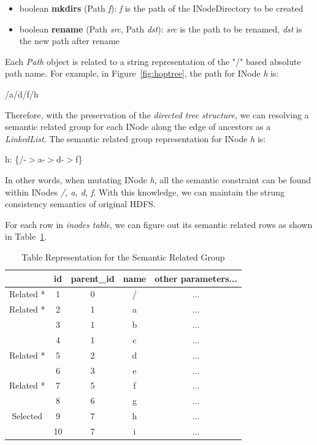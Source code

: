 \begin{itemize}[noitemsep]
	\item boolean \textbf{mkdirs} (Path \textit{f}): \textit{f} is the path of the INodeDirectory to be created
	\item boolean \textbf{rename} (Path \textit{src}, Path \textit{dst}): \textit{src} is the path to be renamed, \textit{dst} is the new path after rename
\end{itemize} 

\noindent Each \textit{Path} object is related to a string representation of the "/" based absolute path name. For example, in Figure~\ref{fig:hoptree}, the path for INode \textit{h} is: 
\begin{center}
	/a/d/f/h
\end{center}

\noindent Therefore, with the preservation of the \textit{directed tree structure}, we can resolving a semantic related group for each INode along the edge of ancestors as a \textit{LinkedList}. The semantic related group representation for INode \textit{h} is:
\begin{center}
	h: \{/-$>$a-$>$d-$>$f\}
\end{center}

\noindent In other words, when mutating INode \textit{h}, all the semantic constraint can be found within INodes \textit{/, a, d, f}. With this knowledge, we can maintain the strung consistency semantics of original HDFS.

\noindent For each row in \textit{inodes table}, we can figure out its semantic related rows as shown in Table~\ref{table:semanticrelatedTable}.

\begin{table}[h]
	\centering
	\begin{tabular}{|c|c|c|c|c|}
		\hline
		~ & \textbf{id} & \textbf{parent\_id} & \textbf{name} & \textbf{other parameters...} \\ \hline
		Related * & 1 & 0 & / & ... \\ \hline
		Related * & 2 & 1 & a & ... \\ \hline
		~ & 3 & 1 & b & ... \\ \hline
		~ & 4 & 1 & c & ... \\ \hline
		Related * & 5 & 2 & d & ... \\ \hline
		~ & 6 & 3 & e & ... \\ \hline
		Related * & 7 & 5 & f & ... \\ \hline
		~ & 8 & 6 & g & ... \\ \hline
		Selected \checkmark & 9 & 7 & h & ... \\ \hline
		~ & 10 & 7 & i & ... \\ \hline
	\end{tabular}
	\caption{Table Representation for the Semantic Related Group}
	\label{table:semanticrelatedTable}
\end{table}

